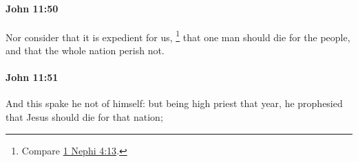 		\paragraph{John 11:50} %
			\label{JOHN-11-50}

			Nor consider that it is expedient for us,
				\footnote{%
					Compare \hyperref[1NEPHI-4-13]{1 Nephi 4:13}.
					}%
			that one man should die for the people, and that the whole nation perish not.

			\begin{framed}
				\scriptsize
				\begin{compactdesc}
					\item[SBLG] 
				\end{compactdesc}
			\end{framed}

		\paragraph{John 11:51} %
			\label{JOHN-11-51}

			And this spake he not of himself: but being high priest that year, he prophesied that Jesus should die for that nation;


